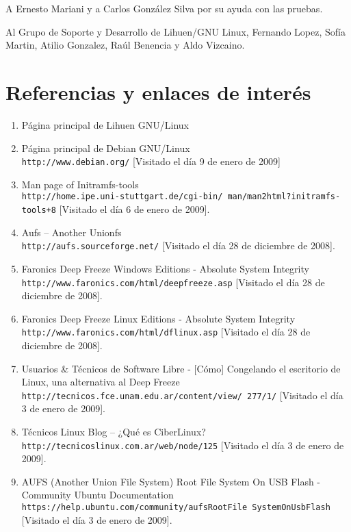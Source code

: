 \documentclass[final,narroweqnarray,inline,twoside]{ieee}
\begin{document}
A Ernesto Mariani y a Carlos González Silva por su ayuda con las pruebas.

Al Grupo de Soporte y Desarrollo de Lihuen/GNU Linux, Fernando Lopez, Sofía Martin, Atilio Gonzalez, Raúl Benencia y Aldo Vizcaino.
\section{Referencias y enlaces de interés}

\begin{enumerate}
\item Página principal de Lihuen GNU/Linux\\
\item Página principal de Debian GNU/Linux\\
\texttt{http://www.debian.org/} [Visitado el día 9 de enero de 2009]
\item Man page of Initramfs-tools\\
\texttt{http://home.ipe.uni-stuttgart.de/cgi-bin/ man/man2html?initramfs-tools+8} [Visitado el día 6 de enero de 2009].
\item Aufs -- Another Unionfs\\
\texttt{http://aufs.sourceforge.net/} [Visitado el día 28 de diciembre de 2008].
\item Faronics Deep Freeze Windows Editions - Absolute System Integrity\\
\texttt{http://www.faronics.com/html/deepfreeze.asp} [Visitado el día 28 de diciembre de 2008].
\item Faronics Deep Freeze Linux Editions - Absolute System Integrity\\
\texttt{http://www.faronics.com/html/dflinux.asp} [Visitado el día 28 de diciembre de 2008].
\item Usuarios \& Técnicos de Software Libre - [Cómo] Congelando el escritorio de Linux, una alternativa al Deep Freeze\\
\texttt{http://tecnicos.fce.unam.edu.ar/content/view/ 277/1/} [Visitado el día 3 de enero de 2009].
\item Técnicos Linux Blog -- ¿Qué es CiberLinux?\\
\texttt{http://tecnicoslinux.com.ar/web/node/125} [Visitado el día 3 de enero de 2009].
\item AUFS (Another Union File System) Root File System On USB Flash - Community Ubuntu Documentation\\
\texttt{https://help.ubuntu.com/community/aufsRootFile SystemOnUsbFlash} [Visitado el día 3 de enero de 2009].

\end{enumerate}
\end{document}

